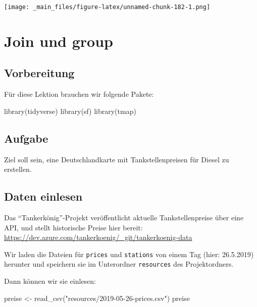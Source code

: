 \documentclass[
  ngerman,
]{article}
\newenvironment{Shaded}{\begin{snugshade}}{\end{snugshade}}
\newcommand{\FunctionTok}[1]{\textcolor[rgb]{0.00,0.00,0.00}{#1}}
\newcommand{\NormalTok}[1]{#1}
\newcommand{\OtherTok}[1]{\textcolor[rgb]{0.56,0.35,0.01}{#1}}
\newcommand{\StringTok}[1]{\textcolor[rgb]{0.31,0.60,0.02}{#1}}
\begin{document}
\texttt{[image: \_main\_files/figure-latex/unnamed-chunk-182-1.png]}

\hypertarget{join-und-group}{%
\section{Join und group}\label{join-und-group}}

\hypertarget{vorbereitung-7}{%
\subsection{Vorbereitung}\label{vorbereitung-7}}

Für diese Lektion brauchen wir folgende Pakete:

\begin{Shaded}
\begin{Highlighting}[]
\FunctionTok{library}\NormalTok{(tidyverse)}
\FunctionTok{library}\NormalTok{(sf)}
\FunctionTok{library}\NormalTok{(tmap)}
\end{Highlighting}
\end{Shaded}

\hypertarget{aufgabe-1}{%
\subsection{Aufgabe}\label{aufgabe-1}}

Ziel soll sein, eine Deutschlandkarte mit Tankstellenpreisen für Diesel zu erstellen.

\hypertarget{daten-einlesen}{%
\subsection{Daten einlesen}\label{daten-einlesen}}

Das ``Tankerkönig''-Projekt veröffentlicht aktuelle Tankstellenpreise über eine API, und stellt historische Preise hier bereit: \url{https://dev.azure.com/tankerkoenig/_git/tankerkoenig-data}

Wir laden die Dateien für \texttt{prices} und \texttt{stations} von einem Tag (hier: 26.5.2019) herunter und speichern sie im Unterordner \texttt{resources} des Projektordners.

Dann können wir sie einlesen:

\begin{Shaded}
\begin{Highlighting}[]
\NormalTok{preise }\OtherTok{\textless{}{-}} \FunctionTok{read\_csv}\NormalTok{(}\StringTok{"resources/2019{-}05{-}26{-}prices.csv"}\NormalTok{)}
\NormalTok{preise}
\end{Highlighting}
\end{Shaded}
\end{document}
